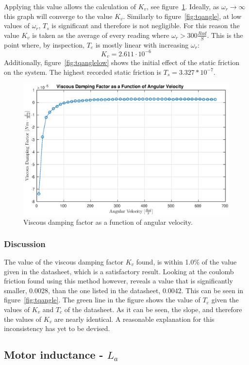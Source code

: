 Applying this value allows the calculation of $K_v$, see figure~\ref{fig:visvel}.
Ideally, as $\omega_r\rightarrow \infty$ this graph will converge to the value $K_v$. 
Similarly to figure~\ref{fig:tqangle}, at low values of $\omega_r$, $T_s$ is significant and therefore is not negligible.
For this reason the value $K_v$ is taken as the average of every reading where $\omega_r>300\frac{Rad}{S}$. 
This is the point where, by inspection, $T_e$ is mostly linear with increasing $\omega_r$:
$$K_v=2.611\cdot 10^{-6}$$
Additionally, figure~\ref{fig:tqanglelow} shows the initial effect of the static friction on the system.
The highest recorded static friction is $T_s=3.327*10^{-7}$.
\begin{figure}[!h]
	\centering
	\includegraphics[width=.75\linewidth]{graphics/visvel}
	\caption{Viscous damping factor as a function of angular velocity.}
	\label{fig:visvel}
\end{figure}
\subsubsection{Discussion}
The value of the viscous damping factor $K_v$ found, is within 1.0\% of the value given in the datasheet, which is a satisfactory result.
Looking at the coulomb friction found using this method however, reveals a value that is significantly smaller, 0.0028, than the one listed in the datasheet, 0.0042.
This can be seen in figure~\ref{fig:tqangle}. 
The green line in the figure shows the value of $T_e$ given the values of $K_v$ and $T_c$ of the datasheet.
As it can be seen, the slope, and therefore the values of $K_v$ are nearly identical.
A reasonable explanation for this inconsistency has yet to be devised.

\subsection{Motor inductance - $L_a$}
\label{sec:incuctance}
